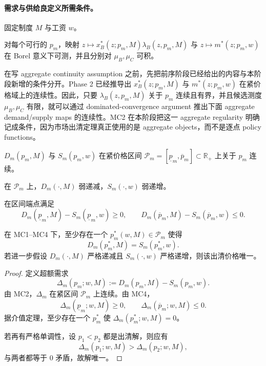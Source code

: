 \paragraph{需求与供给良定义所需条件。}
固定制度 $M$ 与工资 $w$。
\begin{assumption}[MC1：可积性]
对每个可行的 $p_m$，映射 $z\mapsto x_B^*(z;p_m,M)\lambda_B(z,p_m,M)$ 与 $z\mapsto m^*(z;p_m,w)$ 在 Borel 意义下可测，并且分别对 $\mu_B,\mu_C$ 可积。
\end{assumption}

在写 aggregate continuity assumption 之前，先把前序阶段已经给出的内容与本阶段新增的条件分开。Phase 2 已经推导出 $x_B^*(z;p_m,M)$ 与 $m^*(z;p_m,w)$ 在紧价格域上的连续性。因此，只要 $\lambda_B(z,p_m,M)$ 关于 $p_m$ 连续且有界，并且候选测度 $\mu_B,\mu_C$ 有限，就可以通过 dominated-convergence argument 推出下面 aggregate demand/supply maps 的连续性。MC2 在本阶段把这一 aggregate regularity 明确记成条件，因为市场出清定理真正使用的是 aggregate objects，而不是逐点 policy functions。

\begin{assumption}[MC2：关于 $p_m$ 的连续性]
$D_m(p_m,M)$ 与 $S_m(p_m,w)$ 在紧价格区间 $\mathcal P_m=[\underline p_m,\overline p_m]\subset\mathbb R_+$ 上关于 $p_m$ 连续。
\end{assumption}

\begin{assumption}[MC3：单调性]
在 $\mathcal P_m$ 上，$D_m(\cdot,M)$ 弱递减，$S_m(\cdot,w)$ 弱递增。
\end{assumption}

\begin{assumption}[MC4：端点跨越条件]
在区间端点满足
\[
D_m(\underline p_m,M)-S_m(\underline p_m,w)\ge 0,
\qquad
D_m(\overline p_m,M)-S_m(\overline p_m,w)\le 0.
\]
\end{assumption}

\begin{proposition}[合格受托生产市场出清价格的存在性]
在 MC1--MC4 下，至少存在一个 $p_m^*(w,M)\in\mathcal P_m$ 使得
\[
D_m(p_m^*,M)=S_m(p_m^*,w).
\]
若进一步假设 $D_m(\cdot,M)$ 严格递减且 $S_m(\cdot,w)$ 严格递增，则该出清价格唯一。
\end{proposition}

\begin{proof}
定义超额需求
\[
\Delta_m(p_m;w,M):=D_m(p_m,M)-S_m(p_m,w).
\]
由 MC2，$\Delta_m$ 在紧区间 $\mathcal P_m$ 上连续。由 MC4，
\[
\Delta_m(\underline p_m;w,M)\ge 0,
\qquad
\Delta_m(\overline p_m;w,M)\le 0.
\]
据介值定理，至少存在一个 $p_m^*$ 使 $\Delta_m(p_m^*;w,M)=0$。

若再有严格单调性，设 $p_1<p_2$ 都是出清解，则应有
\[
\Delta_m(p_1;w,M)>\Delta_m(p_2;w,M),
\]
与两者都等于 0 矛盾，故解唯一。
\end{proof}

